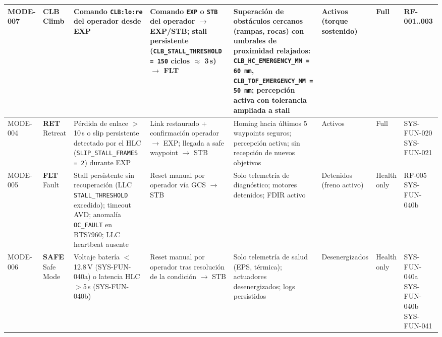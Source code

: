 \begin{landscape}
\begin{longtable}{| l | l | p{3.0cm} | p{2.8cm} | p{3.0cm} | p{2.5cm} | p{1.6cm} | p{2.5cm} |}
MODE-007 & \textbf{CLB} \newline Climb &
Comando \texttt{CLB:lo:re} del operador desde EXP &
Comando \texttt{EXP} o \texttt{STB} del operador $\rightarrow$ EXP/STB; stall persistente (\texttt{CLB\_STALL\_THRESHOLD = 150} ciclos $\approx$ 3\,s) $\rightarrow$ FLT &
Superación de obstáculos cercanos (rampas, rocas) con umbrales de proximidad relajados: \texttt{CLB\_HC\_EMERGENCY\_MM = 60\,mm}, \texttt{CLB\_TOF\_EMERGENCY\_MM = 50\,mm}; percepción activa con tolerancia ampliada a stall &
Activos \newline (torque sostenido) &
Full &
RF-001..003 \\ \hline

MODE-004 & \textbf{RET} \newline Retreat &
Pérdida de enlace $>$10\,s o slip persistente detectado por el HLC (\texttt{SLIP\_STALL\_FRAMES = 2}) durante EXP &
Link restaurado + confirmación operador $\rightarrow$ EXP; llegada a safe waypoint $\rightarrow$ STB &
Homing hacia últimos 5 waypoints seguros; percepción activa; sin recepción de nuevos objetivos &
Activos &
Full &
SYS-FUN-020 \newline SYS-FUN-021 \\ \hline

MODE-005 & \textbf{FLT} \newline Fault &
Stall persistente sin recuperación (LLC \texttt{STALL\_THRESHOLD} excedido); timeout AVD; anomalía \texttt{OC\_FAULT} en BTS7960; LLC heartbeat ausente &
Reset manual por operador vía GCS $\rightarrow$ STB &
Solo telemetría de diagnóstico; motores detenidos; FDIR activo &
Detenidos \newline (freno activo) &
Health only &
RF-005 \newline SYS-FUN-040b \\ \hline

MODE-006 & \textbf{SAFE} \newline Safe Mode &
Voltaje batería $<$12.8\,V (SYS-FUN-040a) o latencia HLC $>$5\,s (SYS-FUN-040b) &
Reset manual por operador tras resolución de la condición $\rightarrow$ STB &
Solo telemetría de salud (EPS, térmica); actuadores desenergizados; logs persistidos &
Desenergizados &
Health only &
SYS-FUN-040a \newline SYS-FUN-040b \newline SYS-FUN-041 \\ \hline

\end{longtable}
\end{landscape}

